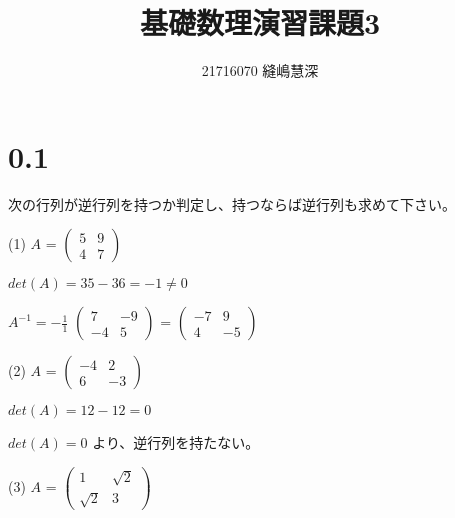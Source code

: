 \documentclass{jsarticle}
\title{基礎数理演習課題3}
\author{21716070 縫嶋慧深}
\begin{document}
	\maketitle

	\section*{0.1}
    次の行列が逆行列を持つか判定し、持つならば逆行列も求めて下さい。

	\begin{description}
		\setlength{\itemsep}{0.5cm}
        \begin{spacing}{1.2}

            \item[(1)]
                $ A $ =
                $ \begin{pmatrix}
                    5 & 9 \\
                    4 & 7
                \end{pmatrix} $

                $ det(A) = 35 - 36 = -1 \neq 0 $

                $ A^{-1} = -\frac{1}{1} $
                $ \begin{pmatrix}
                    7 & -9 \\
                    -4 & 5
                \end{pmatrix} $
                =
                $ \begin{pmatrix}
                    -7 & 9 \\
                    4 & -5
                \end{pmatrix} $

            \item[(2)]
                $ A $ =
                $ \begin{pmatrix}
                    -4 & 2 \\
                    6 & -3
                \end{pmatrix} $

                $ det(A) = 12 - 12 = 0 $

                $ det(A) = 0 $ より、逆行列を持たない。

            \item[(3)]
                $ A $ =
                $ \begin{pmatrix}
                    1 & \sqrt{2} \\
                    \sqrt{2} & 3
                \end{pmatrix} $


\end{spacing}
\end{description}
\end{document}
